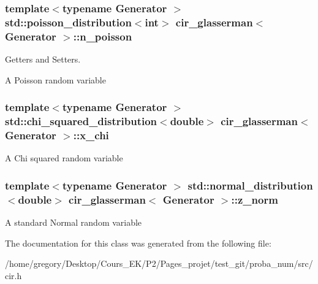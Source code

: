 \subsubsection[{\texorpdfstring{n\+\_\+poisson}{n_poisson}}]{\setlength{\rightskip}{0pt plus 5cm}template$<$typename Generator $>$ std\+::poisson\+\_\+distribution$<$int$>$ {\bf cir\+\_\+glasserman}$<$ Generator $>$\+::n\+\_\+poisson\hspace{0.3cm}{\ttfamily [protected]}}\hypertarget{classcir__glasserman_aed2bd8f09e275a2fd0012989771c61f7}{}\label{classcir__glasserman_aed2bd8f09e275a2fd0012989771c61f7}


Getters and Setters. 

A Poisson random variable 
\subsubsection[{\texorpdfstring{x\+\_\+chi}{x_chi}}]{\setlength{\rightskip}{0pt plus 5cm}template$<$typename Generator $>$ std\+::chi\+\_\+squared\+\_\+distribution$<$double$>$ {\bf cir\+\_\+glasserman}$<$ Generator $>$\+::x\+\_\+chi\hspace{0.3cm}{\ttfamily [protected]}}\hypertarget{classcir__glasserman_a1f91410b367839c4b81e8e89e9597848}{}\label{classcir__glasserman_a1f91410b367839c4b81e8e89e9597848}
A Chi squared random variable 
\subsubsection[{\texorpdfstring{z\+\_\+norm}{z_norm}}]{\setlength{\rightskip}{0pt plus 5cm}template$<$typename Generator $>$ std\+::normal\+\_\+distribution$<$double$>$ {\bf cir\+\_\+glasserman}$<$ Generator $>$\+::z\+\_\+norm\hspace{0.3cm}{\ttfamily [protected]}}\hypertarget{classcir__glasserman_ab16c1db0bb521957833f67c690b6b8a4}{}\label{classcir__glasserman_ab16c1db0bb521957833f67c690b6b8a4}
A standard Normal random variable 

The documentation for this class was generated from the following file\+:\begin{DoxyCompactItemize}
\item 
/home/gregory/\+Desktop/\+Cours\+\_\+\+E\+K/\+P2/\+Pages\+\_\+projet/test\+\_\+git/proba\+\_\+num/src/cir.\+h\end{DoxyCompactItemize}
